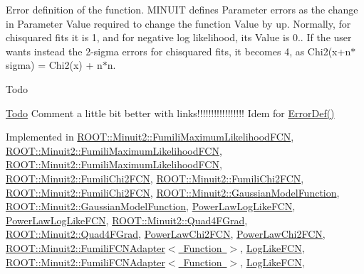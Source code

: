 Error definition of the function. M\+I\+N\+U\+IT defines Parameter errors as the change in Parameter Value required to change the function Value by up. Normally, for chisquared fits it is 1, and for negative log likelihood, its Value is 0.. If the user wants instead the 2-\/sigma errors for chisquared fits, it becomes 4, as Chi2(x+n$\ast$sigma) = Chi2(x) + n$\ast$n.

\begin{DoxyRefDesc}{Todo}
\item[\mbox{\hyperlink{todo__todo000025}{Todo}}]Comment a little bit better with links!!!!!!!!!!!!!!!!! Idem for \mbox{\hyperlink{classROOT_1_1Minuit2_1_1FCNBase_ac4592475c58a65b037ba97ab5f3cba10}{Error\+Def()}}\end{DoxyRefDesc}


Implemented in \mbox{\hyperlink{classROOT_1_1Minuit2_1_1FumiliMaximumLikelihoodFCN_ab945da701895bfba143da08f76ba2d05}{R\+O\+O\+T\+::\+Minuit2\+::\+Fumili\+Maximum\+Likelihood\+F\+CN}}, \mbox{\hyperlink{classROOT_1_1Minuit2_1_1FumiliMaximumLikelihoodFCN_ab945da701895bfba143da08f76ba2d05}{R\+O\+O\+T\+::\+Minuit2\+::\+Fumili\+Maximum\+Likelihood\+F\+CN}}, \mbox{\hyperlink{classROOT_1_1Minuit2_1_1FumiliMaximumLikelihoodFCN_ab945da701895bfba143da08f76ba2d05}{R\+O\+O\+T\+::\+Minuit2\+::\+Fumili\+Maximum\+Likelihood\+F\+CN}}, \mbox{\hyperlink{classROOT_1_1Minuit2_1_1FumiliChi2FCN_a7e68bc2b2eb631ec52b753d7d49c4414}{R\+O\+O\+T\+::\+Minuit2\+::\+Fumili\+Chi2\+F\+CN}}, \mbox{\hyperlink{classROOT_1_1Minuit2_1_1FumiliChi2FCN_a7e68bc2b2eb631ec52b753d7d49c4414}{R\+O\+O\+T\+::\+Minuit2\+::\+Fumili\+Chi2\+F\+CN}}, \mbox{\hyperlink{classROOT_1_1Minuit2_1_1FumiliChi2FCN_a7e68bc2b2eb631ec52b753d7d49c4414}{R\+O\+O\+T\+::\+Minuit2\+::\+Fumili\+Chi2\+F\+CN}}, \mbox{\hyperlink{classROOT_1_1Minuit2_1_1GaussianModelFunction_ae99a5c50055e4563a2252ba8ceb19d20}{R\+O\+O\+T\+::\+Minuit2\+::\+Gaussian\+Model\+Function}}, \mbox{\hyperlink{classROOT_1_1Minuit2_1_1GaussianModelFunction_ae99a5c50055e4563a2252ba8ceb19d20}{R\+O\+O\+T\+::\+Minuit2\+::\+Gaussian\+Model\+Function}}, \mbox{\hyperlink{classPowerLawLogLikeFCN_ae1700e7288ed461d0e3354a2f2c5ea6a}{Power\+Law\+Log\+Like\+F\+CN}}, \mbox{\hyperlink{classPowerLawLogLikeFCN_ae1700e7288ed461d0e3354a2f2c5ea6a}{Power\+Law\+Log\+Like\+F\+CN}}, \mbox{\hyperlink{classROOT_1_1Minuit2_1_1Quad4FGrad_a0c477f97bac7a89bea6bdea9fdae92cf}{R\+O\+O\+T\+::\+Minuit2\+::\+Quad4\+F\+Grad}}, \mbox{\hyperlink{classROOT_1_1Minuit2_1_1Quad4FGrad_a0c477f97bac7a89bea6bdea9fdae92cf}{R\+O\+O\+T\+::\+Minuit2\+::\+Quad4\+F\+Grad}}, \mbox{\hyperlink{classPowerLawChi2FCN_ad202014937fe0e66dffc0fa9061ca9df}{Power\+Law\+Chi2\+F\+CN}}, \mbox{\hyperlink{classPowerLawChi2FCN_ad202014937fe0e66dffc0fa9061ca9df}{Power\+Law\+Chi2\+F\+CN}}, \mbox{\hyperlink{classROOT_1_1Minuit2_1_1FumiliFCNAdapter_aeed5b77f0bcca4854a9e6b0620ab3cb9}{R\+O\+O\+T\+::\+Minuit2\+::\+Fumili\+F\+C\+N\+Adapter$<$ Function $>$}}, \mbox{\hyperlink{structLogLikeFCN_ace81f647c3b49597fdfa5a9ff88e56d4}{Log\+Like\+F\+CN}}, \mbox{\hyperlink{classROOT_1_1Minuit2_1_1FumiliFCNAdapter_aeed5b77f0bcca4854a9e6b0620ab3cb9}{R\+O\+O\+T\+::\+Minuit2\+::\+Fumili\+F\+C\+N\+Adapter$<$ Function $>$}}, \mbox{\hyperlink{structLogLikeFCN_ace81f647c3b49597fdfa5a9ff88e56d4}{Log\+Like\+F\+CN}}, 